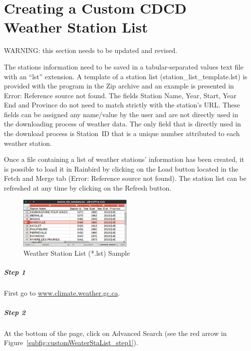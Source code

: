 \documentclass[WHATMANUAL.tex]{subfiles}
\begin{document}
\chapter{Creating a Custom CDCD Weather Station List}
\label{app:custom_station_list}

WARNING: this section needs to be updated and revised.

The stations information need to be saved in a tabular-separated values text file with an “lst” extension. A template of a station list (station\_list\_template.lst) is provided with the program in the Zip archive and an example is presented in Error: Reference source not found. The fields Station Name, Year, Start, Year End and Province do not need to match strictly with the station's URL. These fields can be assigned any name/value by the user and are not directly used in the downloading process of weather data. The only field that is directly used in the download process is Station ID that is a unique number attributed to each weather station.

Once a file containing a list of weather stations' information has been created, it is possible to load it in Rainbird by clicking on the  Load button located in the Fetch and Merge tab (Error: Reference source not found). The station list can be refreshed at any time by clicking on the  Refresh button.

\begin{figure}[h!]
\centering
\includegraphics[width=0.5\textwidth]{img/example_staList}
\caption[Weather Station List (*.lst) Sample]{Weather Station List (*.lst) Sample}
\label{fig:example_staList}
\end{figure}

\paragraph{Step 1} First go to \url{www.climate.weather.gc.ca}.

\paragraph{Step 2} At the bottom of the page, click on Advanced Search (see the red arrow in Figure~\ref{subfig:customWeaterStaList_step1}).
\end{document}
